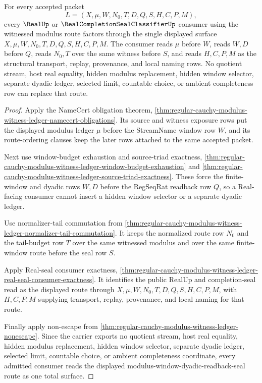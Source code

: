 \begin{theorem}
\label{thm:regular-cauchy-modulus-witness-ledger-consumer-totality}
For every accepted packet
$$
L=(X,\mu,W,N_0,T,D,Q,S,H,C,P,M),
$$
every $\RealUp$ or $\RealCompletionSealClassifierUp$ consumer using the witnessed modulus route factors through the single displayed surface $X,\mu,W,N_0,T,D,Q,S,H,C,P,M$. The consumer reads $\mu$ before $W$, reads $W,D$ before $Q$, reads $N_0,T$ over the same witness before $S$, and reads $H,C,P,M$ as the structural transport, replay, provenance, and local naming rows. No quotient stream, host real equality, hidden modulus replacement, hidden window selector, separate dyadic ledger, selected limit, countable choice, or ambient completeness row can replace that route.
\end{theorem}
\begin{proof}
Apply the NameCert obligation theorem, \autoref{thm:regular-cauchy-modulus-witness-ledger-namecert-obligations}. Its source and witness exposure rows put the displayed modulus ledger $\mu$ before the StreamName window row $W$, and its route-ordering clauses keep the later rows attached to the same accepted packet.

Next use window-budget exhaustion and source-triad exactness, \autoref{thm:regular-cauchy-modulus-witness-ledger-window-budget-exhaustion} and \autoref{thm:regular-cauchy-modulus-witness-ledger-source-triad-exactness}. These force the finite-window and dyadic rows $W,D$ before the RegSeqRat readback row $Q$, so a Real-facing consumer cannot insert a hidden window selector or a separate dyadic ledger.

Use normalizer-tail commutation from \autoref{thm:regular-cauchy-modulus-witness-ledger-normalizer-tail-commutation}. It keeps the normalized route row $N_0$ and the tail-budget row $T$ over the same witnessed modulus and over the same finite-window route before the seal row $S$.

Apply Real-seal consumer exactness, \autoref{thm:regular-cauchy-modulus-witness-ledger-real-seal-consumer-exactness}. It identifies the public RealUp and completion-seal read as the displayed route through $X,\mu,W,N_0,T,D,Q,S,H,C,P,M$, with $H,C,P,M$ supplying transport, replay, provenance, and local naming for that route.

Finally apply non-escape from \autoref{thm:regular-cauchy-modulus-witness-ledger-nonescape}. Since the carrier exports no quotient stream, host real equality, hidden modulus replacement, hidden window selector, separate dyadic ledger, selected limit, countable choice, or ambient completeness coordinate, every admitted consumer reads the displayed modulus-window-dyadic-readback-seal route as one total surface.
\end{proof}

